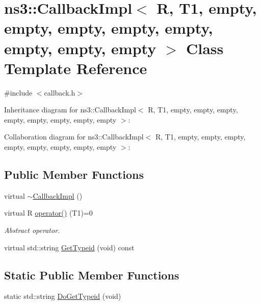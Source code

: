 \hypertarget{classns3_1_1CallbackImpl_3_01R_00_01T1_00_01empty_00_01empty_00_01empty_00_01empty_00_01empty_00c071cdb1282a8cbdb8ea6ad8db32df61}{}\section{ns3\+:\+:Callback\+Impl$<$ R, T1, empty, empty, empty, empty, empty, empty, empty, empty $>$ Class Template Reference}
\label{classns3_1_1CallbackImpl_3_01R_00_01T1_00_01empty_00_01empty_00_01empty_00_01empty_00_01empty_00c071cdb1282a8cbdb8ea6ad8db32df61}


{\ttfamily \#include $<$callback.\+h$>$}



Inheritance diagram for ns3\+:\+:Callback\+Impl$<$ R, T1, empty, empty, empty, empty, empty, empty, empty, empty $>$\+:


Collaboration diagram for ns3\+:\+:Callback\+Impl$<$ R, T1, empty, empty, empty, empty, empty, empty, empty, empty $>$\+:
\subsection*{Public Member Functions}
\begin{DoxyCompactItemize}
\item 
virtual \hyperlink{classns3_1_1CallbackImpl_3_01R_00_01T1_00_01empty_00_01empty_00_01empty_00_01empty_00_01empty_00c071cdb1282a8cbdb8ea6ad8db32df61_a2302267b7899d8e2c5aeb6747ae19581}{$\sim$\+Callback\+Impl} ()
\item 
virtual R \hyperlink{classns3_1_1CallbackImpl_3_01R_00_01T1_00_01empty_00_01empty_00_01empty_00_01empty_00_01empty_00c071cdb1282a8cbdb8ea6ad8db32df61_a4e038c900018c8a81fcf4ffc4741e17a}{operator()} (T1)=0
\begin{DoxyCompactList}\small\item\em Abstract operator. \end{DoxyCompactList}\item 
virtual std\+::string \hyperlink{classns3_1_1CallbackImpl_3_01R_00_01T1_00_01empty_00_01empty_00_01empty_00_01empty_00_01empty_00c071cdb1282a8cbdb8ea6ad8db32df61_a944ff2bf86ed9410c7ef7012f6939153}{Get\+Typeid} (void) const 
\end{DoxyCompactItemize}
\subsection*{Static Public Member Functions}
\begin{DoxyCompactItemize}
\item 
static std\+::string \hyperlink{classns3_1_1CallbackImpl_3_01R_00_01T1_00_01empty_00_01empty_00_01empty_00_01empty_00_01empty_00c071cdb1282a8cbdb8ea6ad8db32df61_ae8b5f972ae39a4e16fa8605d7c04e28d}{Do\+Get\+Typeid} (void)
\end{DoxyCompactItemize}
